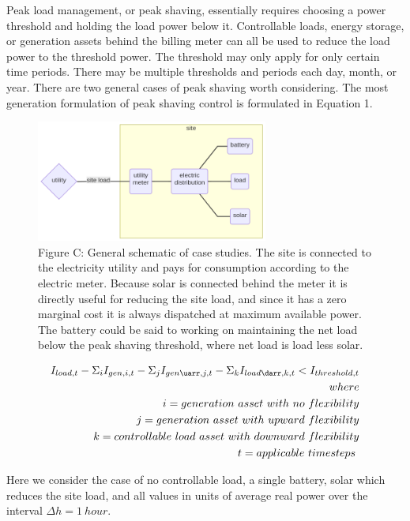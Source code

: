 \documentclass[
]{article}
\begin{document}
Peak load management, or peak shaving, essentially requires choosing a
power threshold and holding the load power below it. Controllable loads,
energy storage, or generation assets behind the billing meter can all be
used to reduce the load power to the threshold power. The threshold may
only apply for only certain time periods. There may be multiple
thresholds and periods each day, month, or year. There are two general
cases of peak shaving worth considering. The most generation formulation
of peak shaving control is formulated in Equation 1.

\begin{figure}
\centering
\includegraphics[width=3in,height=\textheight]{16932411489031.png}
\caption{Figure C: General schematic of case studies. The site is connected
to the electricity utility and pays for consumption according to the
electric meter. Because solar is connected behind the meter it is
directly useful for reducing the site load, and since it has a zero
marginal cost it is always dispatched at maximum available power. The
battery could be said to working on maintaining the net load below the
peak shaving threshold, where net load is load less solar.}
\end{figure}

\begin{equation}
  \begin{align}
I_{load,t} - \Sigma_i I_{gen,i,t} - \Sigma_j I_{gen\uarr,j,t} - \Sigma_k I_{load\darr,k,t} < I_{threshold,t} \\
where \\
i=generation\ asset\ with\ no\ flexibility \\
j=generation\ asset\ with\ upward\ flexibility \\
k=controllable\ load\ asset\ with\ downward\ flexibility \\
t=applicable\ timesteps\
  \end{align}
\end{equation}

Here we consider the case of no controllable load, a single battery,
solar which reduces the site load, and all values in units of average
real power over the interval \(\Delta h = 1\ hour\).
\end{document}
